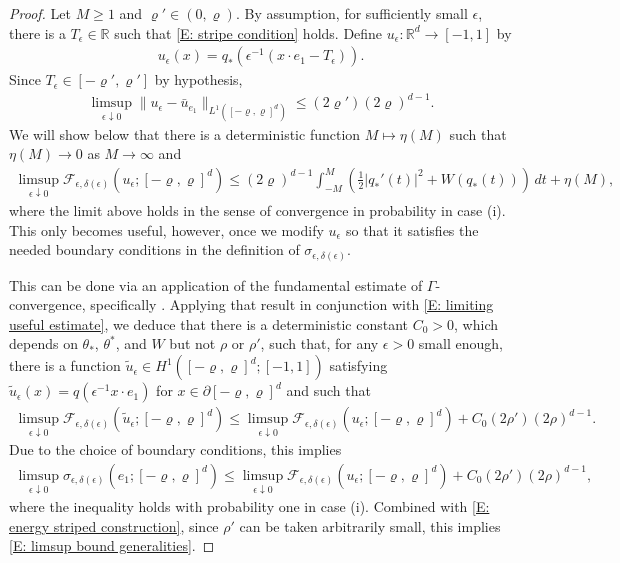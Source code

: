 \documentclass[12pt]{amsart}
\begin{document}
\begin{proof}
    Let $M \geq 1$ and $\varrho' \in (0,\varrho)$.  By assumption, for sufficiently small $\epsilon$, there is a $T_{\epsilon} \in \mathbb{R}$ such that \eqref{E: stripe condition} holds.  Define $u_{\epsilon} : \mathbb{R}^{d} \to [-1,1]$ by
		\begin{align*}
			u_{\epsilon}(x) = q_{*} ( \epsilon^{-1} ( x \cdot e_{1} - T_{\epsilon} ) ).
		\end{align*}
	Since $T_{\epsilon} \in [-\varrho',\varrho']$ by hypothesis,
		\begin{align} \label{E: limiting useful estimate}
			\limsup_{ \epsilon \downarrow 0 } \| u_{\epsilon} - \bar{u}_{e_{1}} \|_{L^{1}([-\varrho,\varrho]^{d})} \leq (2 \varrho') (2\varrho)^{d-1} .
		\end{align}
	We will show below that there is a deterministic function $M \mapsto \eta(M)$ such that $\eta(M) \to 0$ as $M \to \infty$ and
		\begin{align} \label{E: energy striped construction}
			\limsup_{ \epsilon \downarrow 0 } \mathscr{F}_{\epsilon,\delta(\epsilon)} ( u_{\epsilon} ; [-\varrho,\varrho]^{d} ) \leq ( 2 \varrho )^{d-1} \int_{-M}^{M} \left( \frac{1}{2} | q_{*}'(t) |^{2} + W(q_{*}(t)) \right) \, dt + \eta(M),
		\end{align}
	where the limit above holds in the sense of convergence in probability in case (i).  This only becomes useful, however, once we modify $u_{\epsilon}$ so that it satisfies the needed boundary conditions in the definition of $\sigma_{\epsilon,\delta(\epsilon)}$.

    This can be done via an application of the fundamental estimate of $\Gamma$-convergence, specifically \cite[Theorem 6]{morfe}.  Applying that result in conjunction with \eqref{E: limiting useful estimate}, we deduce that  there is a deterministic constant $C_{0} > 0$, which depends on $\theta_{*}$, $\theta^{*}$, and $W$ but not $\rho$ or $\rho'$, such that, for any $\epsilon > 0$ small enough, there is a function $\tilde{u}_{\epsilon} \in H^{1}([-\varrho,\varrho]^{d};[-1,1])$ satisfying $\tilde{u}_{\epsilon}(x) = q(\epsilon^{-1} x \cdot e_{1} )$ for $x \in \partial [-\varrho,\varrho]^{d}$ and such that
        \begin{align*}
            \limsup_{ \epsilon \downarrow 0 } \mathscr{F}_{\epsilon,\delta(\epsilon)} (\tilde{u}_{\epsilon}; [-\varrho,\varrho]^{d}) \leq \limsup_{ \epsilon \downarrow 0 } \mathscr{F}_{\epsilon,\delta(\epsilon)}(u_{\epsilon}; [-\varrho,\varrho]^{d}) + C_{0} ( 2 \rho' ) ( 2 \rho )^{d-1} .  
        \end{align*}
    Due to the choice of boundary conditions, this implies
        \begin{align*}
            \limsup_{ \epsilon \downarrow 0 } \sigma_{\epsilon,\delta(\epsilon)}(e_{1};[-\varrho,\varrho]^{d}) \leq \limsup_{ \epsilon \downarrow 0 } \mathscr{F}_{\epsilon,\delta(\epsilon)}(u_{\epsilon}; [-\varrho,\varrho]^{d}) + C_{0} ( 2 \rho' ) ( 2 \rho )^{d-1},
        \end{align*}
     where the inequality holds with probability one in case (i).  Combined with \eqref{E: energy striped construction}, since $\rho'$ can be taken arbitrarily small, this implies \eqref{E: limsup bound generalities}.
	

\end{proof}
\end{document}
